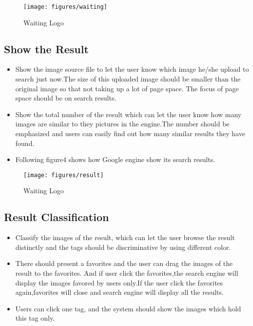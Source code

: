 \documentclass{hci}
\begin{document}
\begin{figure}[htbp]
	\centering
	\texttt{[image: figures/waiting]}
	\caption{Waiting Logo}
	\label{fig:waiting}
\end{figure}
	
\subsection{Show the Result}


\begin{itemize}
	\item Show the image source file to let the user know which image he/she upload to search just now.The size of this uploaded image should be smaller than the original image so that not taking up a lot of page space. The focus of page space should be on search results.

	\item Show the total number of the result which can let the user know how many images are similar to they pictures in the engine.The number should be emphasized and users can easily find out how many similar results they have found.
	\item Following figure4 shows how Google engine show its search results.
	
\end{itemize}
\begin{figure}[htbp]
	\centering
	\texttt{[image: figures/result]}
	\caption{Waiting Logo}
	\label{fig:result}
\end{figure}

\subsection{Result Classification}
\begin{itemize}
	\item Classify the images of the result, which can let the user browse the result distinctly and the tags should
	be discriminative by using different color.
	
	\item There should present a favorites and the user can drag the images of the result to the favorites. And if user click the favorites,the search engine will display the images favored by users only.If the user click the favorites again,favorites will close and search engine will display all the results.
	
	\item Users can click one tag, and the system should show the images which hold this tag only.
	
\end{itemize}
\end{document}
